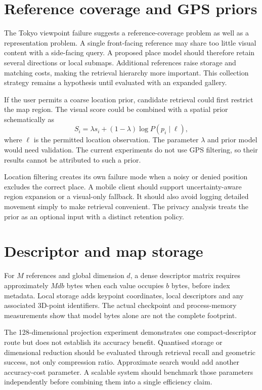 \section{Reference coverage and GPS priors}
The Tokyo viewpoint failure suggests a reference-coverage problem as well as a representation problem. A single front-facing reference may share too little visual content with a side-facing query. A proposed place model should therefore retain several directions or local submaps. Additional references raise storage and matching costs, making the retrieval hierarchy more important. This collection strategy remains a hypothesis until evaluated with an expanded gallery.

If the user permits a coarse location prior, candidate retrieval could first restrict the map region. The visual score could be combined with a spatial prior schematically as
\begin{equation}
 S_i=\lambda s_i+(1-\lambda)\log P(p_i\mid\ell),
\end{equation}
where $\ell$ is the permitted location observation. The parameter $\lambda$ and prior model would need validation. The current experiments do not use GPS filtering, so their results cannot be attributed to such a prior.

Location filtering creates its own failure mode when a noisy or denied position excludes the correct place. A mobile client should support uncertainty-aware region expansion or a visual-only fallback. It should also avoid logging detailed movement simply to make retrieval convenient. The privacy analysis treats the prior as an optional input with a distinct retention policy.

\ifFullReport
\section{Descriptor and map storage}
For $M$ references and global dimension $d$, a dense descriptor matrix requires approximately $Mdb$ bytes when each value occupies $b$ bytes, before index metadata. Local storage adds keypoint coordinates, local descriptors and any associated 3D-point identifiers. The actual checkpoint and process-memory measurements show that model bytes alone are not the complete footprint.

The 128-dimensional projection experiment demonstrates one compact-descriptor route but does not establish its accuracy benefit. Quantised storage or dimensional reduction should be evaluated through retrieval recall and geometric success, not only compression ratio. Approximate search would add another accuracy-cost parameter. A scalable system should benchmark those parameters independently before combining them into a single efficiency claim.

